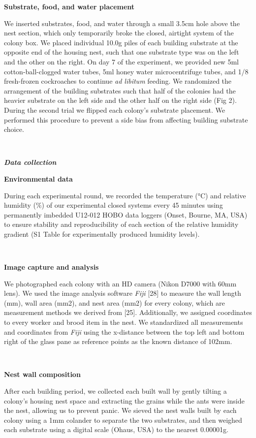 \documentclass[3p]{elsarticle} %
\begin{document}
\textbf{Substrate, food, and water placement}

We inserted substrates, food, and water through a small 3.5cm hole above
the nest section, which only temporarily broke the closed, airtight
system of the colony box. We placed individual 10.0g piles of each
building substrate at the opposite end of the housing nest, such that
one substrate type was on the left and the other on the right. On day 7
of the experiment, we provided new 5ml cotton-ball-clogged water tubes,
5ml honey water microcentrifuge tubes, and 1/8 fresh-frozen cockroaches
to continue \emph{ad libitum} feeding. We randomized the arrangement of
the building substrates such that half of the colonies had the heavier
substrate on the left side and the other half on the right side (Fig 2).
During the second trial we flipped each colony's substrate placement. We
performed this procedure to prevent a side bias from affecting building
substrate choice.

~

\textbf{\emph{Data collection}}

\textbf{Environmental data}

During each experimental round, we recorded the temperature (°C) and
relative humidity (\%) of our experimental closed systems every 45
minutes using permanently imbedded U12-012 HOBO data loggers (Onset,
Bourne, MA, USA) to ensure stability and reproducibility of each section
of the relative humidity gradient (S1 Table for experimentally produced
humidity levels).

~

\textbf{Image capture and analysis}

We photographed each colony with an HD camera (Nikon D7000 with 60mm
lens). We used the image analysis software \emph{Fiji} {[}28{]} to
measure the wall length (mm), wall area (mm2), and nest area (mm2) for
every colony, which are measurement methods we derived from {[}25{]}.
Additionally, we assigned coordinates to every worker and brood item in
the nest. We standardized all measurements and coordinates from
\emph{Fiji} using the x-distance between the top left and bottom right
of the glass pane as reference points as the known distance of 102mm.

~

\textbf{Nest wall composition}

After each building period, we collected each built wall by gently
tilting a colony's housing nest space and extracting the grains while
the ants were inside the nest, allowing us to prevent panic. We sieved
the nest walls built by each colony using a 1mm colander to separate the
two substrates, and then weighed each substrate using a digital scale
(Ohaus, USA) to the nearest 0.00001g.
\end{document}
